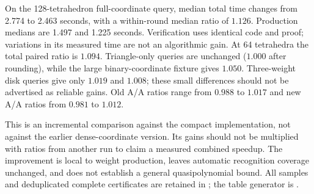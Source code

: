 

On the 128-tetrahedron full-coordinate query, median total time changes from
2.774 to 2.463 seconds, with a within-round median ratio of $1.126$.
Production medians are 1.497 and 1.225 seconds. Verification uses identical
code and proof; variations in its measured time are not an algorithmic gain.
At 64 tetrahedra the total paired ratio is $1.094$. Triangle-only queries
are unchanged ($1.000$ after rounding), while the large binary-coordinate
fixture gives $1.050$. Three-weight disk queries give only $1.019$ and
$1.008$; these small differences should not be advertised as reliable gains.
Old A/A ratios range from $0.988$ to $1.017$ and new A/A ratios from
$0.981$ to $1.012$.

This is an incremental comparison against the compact implementation, not
against the earlier dense-coordinate version. Its gains should not be
multiplied with ratios from another run to claim a measured combined speedup.
The improvement is local to weight production, leaves automatic recognition
coverage unchanged, and does not establish a general quasipolynomial bound.
All samples and deduplicated complete certificates are retained in
; the table generator is
.

